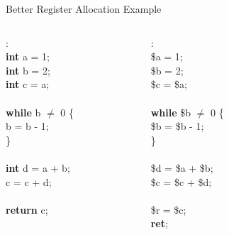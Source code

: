 \documentclass[aspectratio=169]{beamer}
\begin{document}
\begin{frame}{Better Register Allocation Example}
    \begin{columns}
        \begin{column}{1.5cm}
            \begin{algo}
                :\+
                \\ \textbf{int} a = 1;
                \\ \textbf{int} b = 2;
                \\ \textbf{int} c = a;
                \\
                \\ \textbf{while} b $\ne$ 0 \{\+
                \\ b = b - 1;\-
                \\ \}
                \\
                \\ \textbf{int} d = a + b;
                \\ c = c + d;
                \\
                \\ \textbf{return} c;
            \end{algo}
        \end{column}
        \begin{column}{2cm}
            \begin{algo}
                :\+
                \\ \$a = 1;
                \\ \$b = 2;
                \\ \$c = \$a;
                \\
                \\ \textbf{while} \$b $\ne$ 0 \{\+
                \\ \$b = \$b - 1;\-
                \\ \}
                \\
                \\ \$d = \$a + \$b;
                \\ \$c = \$c + \$d;
                \\
                \\ \$r = \$c;
                \\ \textbf{ret};
            \end{algo}
        \end{column}
        \pause
        \begin{column}{3cm}

\end{column}
\end{columns}
\end{frame}
\end{document}

